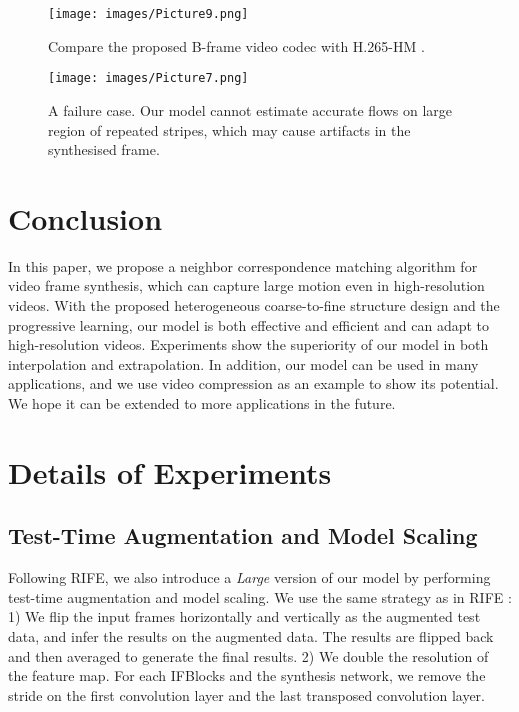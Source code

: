 \documentclass[sigconf]{acmart}
\begin{document}
\begin{figure}[t]
    \texttt{[image: images/Picture9.png]}
    \caption{Compare the proposed B-frame video codec with H.265-HM \cite{HM}.}
    \label{fig9}
\end{figure}

\begin{figure}[t]
    \texttt{[image: images/Picture7.png]}
    \caption{A failure case. Our model cannot estimate accurate flows on large region of repeated stripes, which may cause artifacts in the synthesised frame.}
    \label{fig7}
\end{figure}


\section{Conclusion}

In this paper, we propose a neighbor correspondence matching algorithm for video frame synthesis, which can capture large motion even in high-resolution videos. With the proposed heterogeneous coarse-to-fine structure design and the progressive learning, our model is both effective and efficient and can adapt to high-resolution videos. Experiments show the superiority of our model in both interpolation and extrapolation. In addition, our model can be used in many applications, and we use video compression as an example to show its potential. We hope it can be extended to more applications in the future.


\newpage



\balance


\newpage

\appendix

\section{Details of Experiments}

\subsection{Test-Time Augmentation and Model Scaling}
Following RIFE\cite{huang2020rife}, we also introduce a \textit{Large} version of our model by performing test-time augmentation and model scaling. We use the same strategy as in RIFE : 1) We flip the input frames horizontally and vertically as the augmented test data, and infer the results on the augmented data. The results are flipped back and then averaged to generate the final results. 2) We double the resolution of the feature map. For each IFBlocks and the synthesis network, we remove the stride on the first convolution layer and the last transposed convolution layer.
\end{document}
